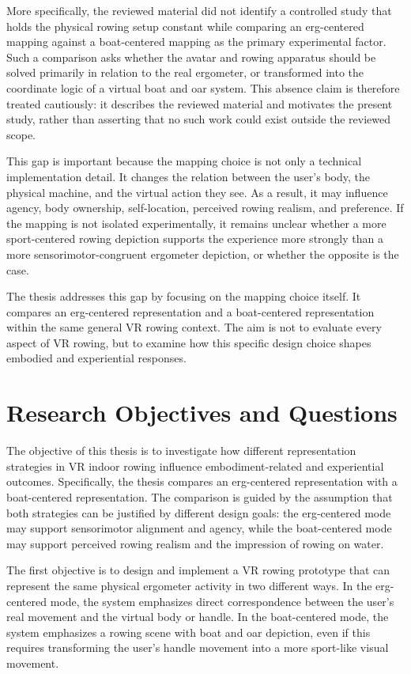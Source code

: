 More specifically, the reviewed material did not identify a controlled study that holds the physical rowing setup constant while comparing an erg-centered mapping against a boat-centered mapping as the primary experimental factor. Such a comparison asks whether the avatar and rowing apparatus should be solved primarily in relation to the real ergometer, or transformed into the coordinate logic of a virtual boat and oar system. This absence claim is therefore treated cautiously: it describes the reviewed material and motivates the present study, rather than asserting that no such work could exist outside the reviewed scope.

This gap is important because the mapping choice is not only a technical implementation detail. It changes the relation between the user's body, the physical machine, and the virtual action they see. As a result, it may influence agency, body ownership, self-location, perceived rowing realism, and preference. If the mapping is not isolated experimentally, it remains unclear whether a more sport-centered rowing depiction supports the experience more strongly than a more sensorimotor-congruent ergometer depiction, or whether the opposite is the case.

The thesis addresses this gap by focusing on the mapping choice itself. It compares an erg-centered representation and a boat-centered representation within the same general VR rowing context. The aim is not to evaluate every aspect of VR rowing, but to examine how this specific design choice shapes embodied and experiential responses.

\section{Research Objectives and Questions}
\label{sec:introduction_research_objectives}

The objective of this thesis is to investigate how different representation strategies in VR indoor rowing influence embodiment-related and experiential outcomes. Specifically, the thesis compares an erg-centered representation with a boat-centered representation. The comparison is guided by the assumption that both strategies can be justified by different design goals: the erg-centered mode may support sensorimotor alignment and agency, while the boat-centered mode may support perceived rowing realism and the impression of rowing on water.

The first objective is to design and implement a VR rowing prototype that can represent the same physical ergometer activity in two different ways. In the erg-centered mode, the system emphasizes direct correspondence between the user's real movement and the virtual body or handle. In the boat-centered mode, the system emphasizes a rowing scene with boat and oar depiction, even if this requires transforming the user's handle movement into a more sport-like visual movement.


